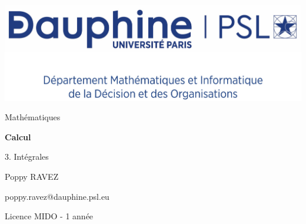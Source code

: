 \documentclass{report}
\author{Prénom NOM}
\begin{document}
\centering
\includegraphics[scale=0.08]{../../../logo/pdf/MIDO_centre}


\sffamily
\vspace{6cm}
\LARGE
\mdseries
Mathématiques

\huge
\bfseries
Calcul

3. Intégrales

\vspace{3cm}
\rmfamily

\mdseries
\makeatletter
\large
Poppy RAVEZ

\vspace{0.2cm}
\normalsize
poppy.ravez@dauphine.psl.eu

\vspace{0.2cm}
Licence MIDO - 1\iere{} année

\vspace{5cm}
\@date
\makeatother
\end{document}
